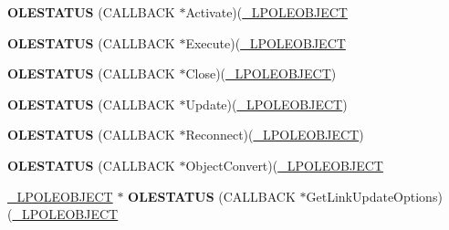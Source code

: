 \begin{DoxyCompactItemize}
\mbox{\label{struct___o_l_e_o_b_j_e_c_t_v_t_b_l_a191e2d28fabaeb71ae917e9d4ffa430c}} 
{\bfseries O\+L\+E\+S\+T\+A\+T\+US} (C\+A\+L\+L\+B\+A\+CK $\ast$Activate)(\hyperlink{struct___o_l_e_o_b_j_e_c_t}{\+\_\+\+L\+P\+O\+L\+E\+O\+B\+J\+E\+CT}
\item 
\mbox{\label{struct___o_l_e_o_b_j_e_c_t_v_t_b_l_abfd1199992be14e9d1a0c0b6998ee64a}} 
{\bfseries O\+L\+E\+S\+T\+A\+T\+US} (C\+A\+L\+L\+B\+A\+CK $\ast$Execute)(\hyperlink{struct___o_l_e_o_b_j_e_c_t}{\+\_\+\+L\+P\+O\+L\+E\+O\+B\+J\+E\+CT}
\item 
\mbox{\label{struct___o_l_e_o_b_j_e_c_t_v_t_b_l_a750e45aa867aab54acd17a202d42cecf}} 
{\bfseries O\+L\+E\+S\+T\+A\+T\+US} (C\+A\+L\+L\+B\+A\+CK $\ast$Close)(\hyperlink{struct___o_l_e_o_b_j_e_c_t}{\+\_\+\+L\+P\+O\+L\+E\+O\+B\+J\+E\+CT})
\item 
\mbox{\label{struct___o_l_e_o_b_j_e_c_t_v_t_b_l_a0bee685e8296aba3205bf399d9a4e9a5}} 
{\bfseries O\+L\+E\+S\+T\+A\+T\+US} (C\+A\+L\+L\+B\+A\+CK $\ast$Update)(\hyperlink{struct___o_l_e_o_b_j_e_c_t}{\+\_\+\+L\+P\+O\+L\+E\+O\+B\+J\+E\+CT})
\item 
\mbox{\label{struct___o_l_e_o_b_j_e_c_t_v_t_b_l_a5e0f2b2cde47bc63819841bc7606833c}} 
{\bfseries O\+L\+E\+S\+T\+A\+T\+US} (C\+A\+L\+L\+B\+A\+CK $\ast$Reconnect)(\hyperlink{struct___o_l_e_o_b_j_e_c_t}{\+\_\+\+L\+P\+O\+L\+E\+O\+B\+J\+E\+CT})
\item 
\mbox{\label{struct___o_l_e_o_b_j_e_c_t_v_t_b_l_ad673d675192cb0bd621634ec883cc055}} 
{\bfseries O\+L\+E\+S\+T\+A\+T\+US} (C\+A\+L\+L\+B\+A\+CK $\ast$Object\+Convert)(\hyperlink{struct___o_l_e_o_b_j_e_c_t}{\+\_\+\+L\+P\+O\+L\+E\+O\+B\+J\+E\+CT}
\item 
\mbox{\label{struct___o_l_e_o_b_j_e_c_t_v_t_b_l_ac56498ab6a1a324e531853e3e2af8c8e}} 
\hyperlink{struct___o_l_e_o_b_j_e_c_t}{\+\_\+\+L\+P\+O\+L\+E\+O\+B\+J\+E\+CT} $\ast$ {\bfseries O\+L\+E\+S\+T\+A\+T\+US} (C\+A\+L\+L\+B\+A\+CK $\ast$Get\+Link\+Update\+Options)(\hyperlink{struct___o_l_e_o_b_j_e_c_t}{\+\_\+\+L\+P\+O\+L\+E\+O\+B\+J\+E\+CT}

\end{DoxyCompactItemize}
